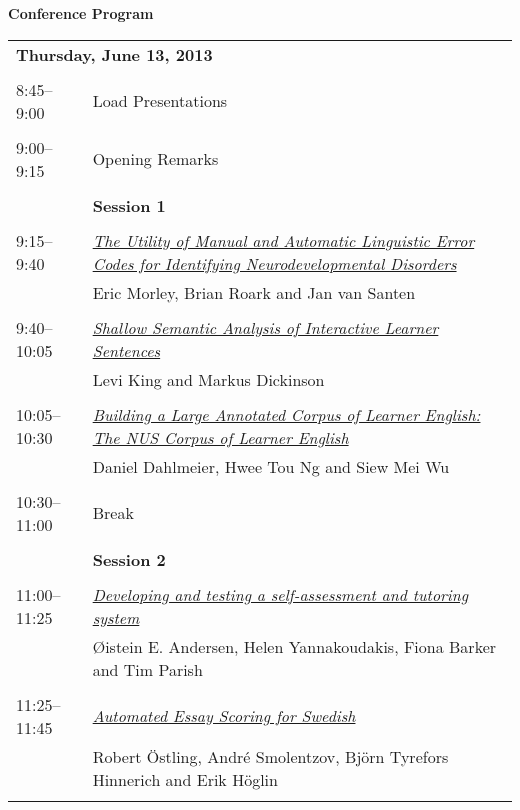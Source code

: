 \setlength{\parindent}{0in}
\setlength{\parskip}{2ex}
\renewcommand{\baselinestretch}{0.87}

\begin{center}
{\Large \bf
  Conference Program
}
\end{center}
\vspace{3mm}
\begin{tabular}{p{20mm}p{128mm}}
\multicolumn{2}{l}{\bf Thursday, June 13, 2013
} \\
\\
8:45--9:00 & Load Presentations
 \\
\\
9:00--9:15 & Opening Remarks
 \\
\\
 & {\bf Session 1
} \\
\\
9:15--9:40 & \hyperlink{page.1}{\em The Utility of Manual and Automatic Linguistic Error Codes for Identifying Neurodevelopmental Disorders}\\
         & Eric Morley, Brian Roark and Jan van Santen \\
\\

9:40--10:05 & \hyperlink{page.11}{\em Shallow Semantic Analysis of Interactive Learner Sentences}\\
         & Levi King and Markus Dickinson \\
\\

10:05--10:30 & \hyperlink{page.22}{\em Building a Large Annotated Corpus of Learner English: The NUS Corpus of Learner English}\\
         & Daniel Dahlmeier, Hwee Tou Ng and Siew Mei Wu \\
\\

10:30--11:00 & Break
 \\
\\
 & {\bf Session 2
} \\
\\
11:00--11:25 & \hyperlink{page.32}{\em Developing and testing a self-assessment and tutoring system}\\
         & {\O}istein E. Andersen, Helen Yannakoudakis, Fiona Barker and Tim Parish \\
\\

11:25--11:45 & \hyperlink{page.42}{\em Automated Essay Scoring for Swedish}\\
         & Robert \"{O}stling, Andr\'{e} Smolentzov, Bj\"{o}rn Tyrefors Hinnerich and Erik H\"{o}glin \\
\\


\end{tabular}
